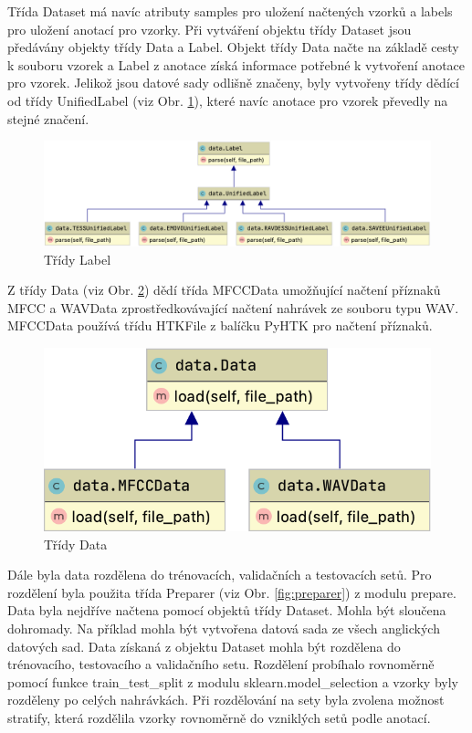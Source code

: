 \documentclass[FM,BP]{tulthesis}
\begin{document}
Třída Dataset má navíc atributy samples pro uložení načtených vzorků a labels pro uložení anotací pro vzorky. Při vytváření objektu třídy Dataset jsou předávány objekty třídy Data a Label. Objekt třídy Data načte na základě cesty k souboru vzorek a Label z anotace získá informace potřebné k vytvoření anotace pro vzorek. Jelikož jsou datové sady odlišně značeny, byly vytvořeny třídy dědící od třídy UnifiedLabel (viz Obr. \ref{fig:label}), které navíc anotace pro vzorek převedly na stejné značení.

\begin{figure}[h]
\centerline{\includegraphics[scale=.25,keepaspectratio]{data-label.png}}
\caption{Třídy Label}
\label{fig:label}
\end{figure}
\FloatBarrier

Z třídy Data (viz Obr. \ref{fig:data}) dědí třída MFCCData umožňující načtení příznaků MFCC a WAVData zprostředkovávající načtení nahrávek ze souboru typu WAV. MFCCData používá třídu HTKFile z balíčku PyHTK pro načtení příznaků.

\begin{figure}[h]
\centerline{\includegraphics[scale=.25,keepaspectratio]{data-data.png}}
\caption{Třídy Data}
\label{fig:data}
\end{figure}
\FloatBarrier

Dále byla data rozdělena do trénovacích, validačních a testovacích setů. Pro rozdělení byla použita třída Preparer (viz Obr. \ref{fig:preparer}) z modulu prepare. Data byla nejdříve načtena pomocí objektů třídy Dataset. Mohla být sloučena dohromady. Na příklad mohla být vytvořena datová sada ze všech anglických datových sad. Data získaná z objektu Dataset mohla být rozdělena do trénovacího, testovacího a validačního setu. Rozdělení probíhalo rovnoměrně pomocí funkce train\_test\_split z modulu sklearn.model\_selection a vzorky byly rozděleny po celých nahrávkách. Při rozdělování na sety byla zvolena možnost stratify, která rozdělila vzorky rovnoměrně do vzniklých setů podle anotací.
\end{document}
